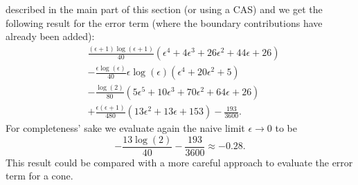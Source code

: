 described in the main part of this section (or using a CAS) and we get the
following result for the error term (where the boundary contributions have
already been added):
\begin{equation}
  \begin{split}
  &\frac{(\epsilon + 1)\log(\epsilon + 1)}{40}
  (\epsilon^4 + 4\epsilon^3 + 26\epsilon^2 + 44\epsilon + 26) \\
  &-
  \frac{\epsilon\log(\epsilon)}{40}
    \epsilon\log(\epsilon)(\epsilon^4 + 20\epsilon^2 + 5) \\
    &-
  \frac{\log(2)}{80}(5\epsilon^5 + 10\epsilon^3 + 70\epsilon^2 + 64\epsilon+26)
  \\
  &+ \frac{\epsilon(\epsilon+1)}{480}(13\epsilon^2 + 13\epsilon + 153)
  -\frac{193}{3600}.
  \end{split}
\end{equation}
For completeness' sake we evaluate again the naive limit $\epsilon\to0$ to be
\begin{equation}
  -\frac{13\log(2)}{40}-\frac{193}{3600} \approx -0.28.
\end{equation}
This result could be compared with a more careful approach to evaluate the error
term for a cone.
